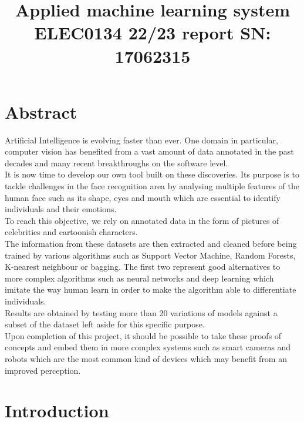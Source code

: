 \documentclass[a4paper,12pt,twoside,twocolumn]{article}
\date{}
\title{Applied machine learning system ELEC0134 22/23 report SN: 17062315}
\begin{document}
\setlength\parindent{0pt}
\maketitle

\section{Abstract}
\label{sec:orgf9cd8ab}

Artificial Intelligence is evolving faster than ever. One domain in particular, computer vision has benefited from a vast amount of data annotated in the past decades and many recent breakthroughs on the software level.\\

It is now time to develop our own tool built on these discoveries. Its purpose is to tackle challenges in the face recognition area by analysing multiple features of the human face such as its shape, eyes and mouth which are essential to identify individuals and their emotions.\\

To reach this objective, we rely on annotated data in the form of pictures of celebrities and cartoonish characters.\\

The information from these datasets are then extracted and cleaned before being trained by various algorithms such as Support Vector Machine, Random Forests, K-nearest neighbour or bagging. The first two represent good alternatives to more complex algorithms such as neural networks and deep learning which imitate the way human learn in order to make the algorithm able to differentiate individuals.\\

Results are obtained by testing more than 20 variations of models against a subset of the dataset left aside for this specific purpose.\\

Upon completion of this project, it should be possible to take these proofs of concepts and embed them in more complex systems such as smart cameras and robots which are the most common kind of devices which may benefit from an improved perception.\\

\section{Introduction}
\label{sec:org673447e}
\end{document}

